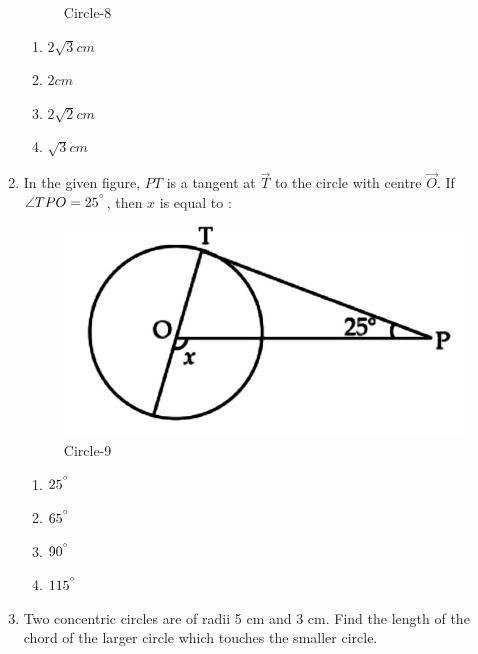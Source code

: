 \documentclass{article}
\begin{document}
\begin{enumerate}
\begin{figure}[h!]
			\caption{Circle-8}
			\label{fig:circle}
		\end{figure}
		\begin{enumerate}
			\item $ 2\sqrt{3} cm $
			\item $ 2 cm $
			\item $ 2\sqrt{2} cm $
			\item $ \sqrt{3} cm $
		\end{enumerate}
	\item In the given figure, $ PT $ is a tangent at $ \vec{T} $ to the circle with centre $ \vec{O} $. If $ \angle{TPO} = 25^{\degree} $, then $ x $ is equal to : 
		\begin{figure}[h!]
			\centering
			\includegraphics[width=0.5\columnwidth]{fig10.jpg}
			\caption{Circle-9}
			\label{fig:circle}
		\end{figure}
		\begin{enumerate}
			\item $ 25^{\degree} $
			\item $ 65^{\degree} $
			\item $ 90^{\degree} $
			\item $ 115^{\degree} $
		\end{enumerate}
	\item Two concentric circles are of radii 5 cm and 3 cm. Find the length of the chord of the larger circle which touches the smaller circle.
\end{enumerate}
\end{document}
